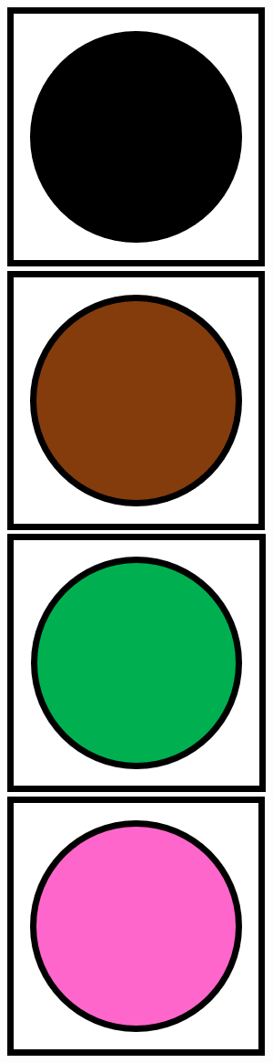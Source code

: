 \documentclass[12pt,a4paper,openright]{book}
\theoremstyle{break}
\begin{document}
\begin{center}
\includegraphics[scale=0.65]{blackCube.png}
\includegraphics[scale=0.65]{brownCube.png}
\includegraphics[scale=0.65]{greenCube.png}
\includegraphics[scale=0.65]{pinkCube.png}

\end{center}
\end{document}
